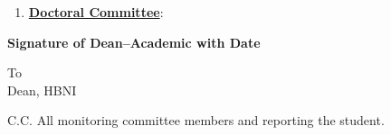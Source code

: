 \documentclass[a4paper]{article}
\begin{document}
\begin{enumerate}[resume=boxed]
    \item \underline{\textbf{Doctoral Committee}}:
    
\end{enumerate}

\vspace{0.5cm}
\begin{flushright}
    \textbf{Signature of Dean--Academic with Date}
\end{flushright}

\vspace{0.5cm}
To \\
\hangindent=1cm Dean, HBNI

\vspace{2cm}
C.C. All monitoring committee members and reporting the student.
\end{document}
